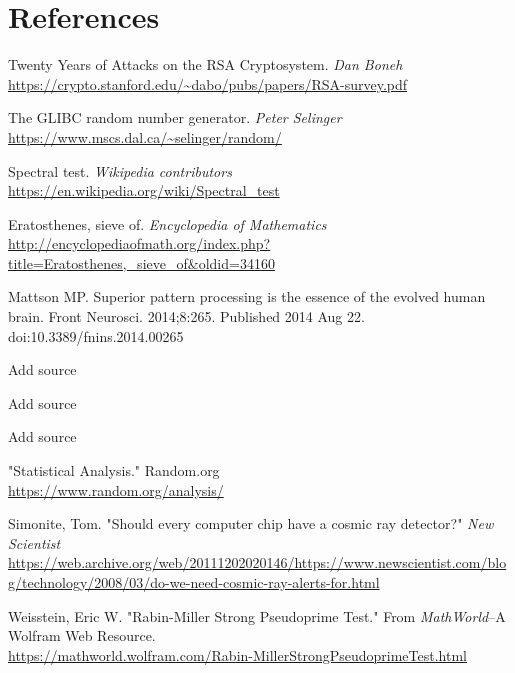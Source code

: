 \documentclass{article}
\begin{document}
\clearpage
\section{References}
\begin{thebibliography}{6}
Twenty Years of Attacks on the RSA Cryptosystem.
\textit{Dan Boneh}
\\\url{https://crypto.stanford.edu/~dabo/pubs/papers/RSA-survey.pdf}

The GLIBC random number generator.
\textit{Peter Selinger}
\\\url{https://www.mscs.dal.ca/~selinger/random/}

Spectral test.
\textit{Wikipedia contributors}
\\\url{https://en.wikipedia.org/wiki/Spectral_test}

Eratosthenes, sieve of.
\textit{Encyclopedia of Mathematics}\\
\url{http://encyclopediaofmath.org/index.php?title=Eratosthenes,_sieve_of&oldid=34160}

Mattson MP. Superior pattern processing is the essence of the evolved human brain. Front Neurosci. 2014;8:265. Published 2014 Aug 22. doi:10.3389/fnins.2014.00265

Add source

Add source

Add source

"Statistical Analysis." Random.org
\\\url{https://www.random.org/analysis/}

Simonite, Tom. "Should every computer chip have a cosmic ray detector?" \textit{New Scientist}
\\\url{https://web.archive.org/web/20111202020146/https://www.newscientist.com/blog/technology/2008/03/do-we-need-cosmic-ray-alerts-for.html}

Weisstein, Eric W. "Rabin-Miller Strong Pseudoprime Test." From \textit{MathWorld}--A Wolfram Web Resource.
\\\url{https://mathworld.wolfram.com/Rabin-MillerStrongPseudoprimeTest.html}
\end{thebibliography}
         
\end{document}
